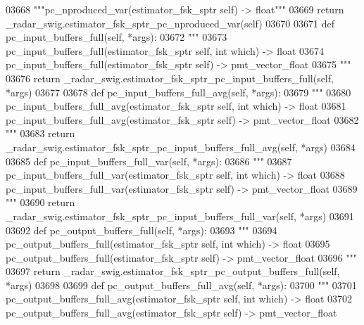 \begin{DoxyCode}
{{{{{{{{{{{{{03668         \textcolor{stringliteral}{"""pc\_nproduced\_var(estimator\_fsk\_sptr self) -> float"""}
03669         \textcolor{keywordflow}{return} \_radar\_swig.estimator\_fsk\_sptr\_pc\_nproduced\_var(self)
03670 
03671     \textcolor{keyword}{def }pc_input_buffers_full(self, *args):
03672         \textcolor{stringliteral}{"""}
03673 \textcolor{stringliteral}{        pc\_input\_buffers\_full(estimator\_fsk\_sptr self, int which) -> float}
03674 \textcolor{stringliteral}{        pc\_input\_buffers\_full(estimator\_fsk\_sptr self) -> pmt\_vector\_float}
03675 \textcolor{stringliteral}{        """}
03676         \textcolor{keywordflow}{return} \_radar\_swig.estimator\_fsk\_sptr\_pc\_input\_buffers\_full(self, *args)
03677 
03678     \textcolor{keyword}{def }pc_input_buffers_full_avg(self, *args):
03679         \textcolor{stringliteral}{"""}
03680 \textcolor{stringliteral}{        pc\_input\_buffers\_full\_avg(estimator\_fsk\_sptr self, int which) -> float}
03681 \textcolor{stringliteral}{        pc\_input\_buffers\_full\_avg(estimator\_fsk\_sptr self) -> pmt\_vector\_float}
03682 \textcolor{stringliteral}{        """}
03683         \textcolor{keywordflow}{return} \_radar\_swig.estimator\_fsk\_sptr\_pc\_input\_buffers\_full\_avg(self, *args)
03684 
03685     \textcolor{keyword}{def }pc_input_buffers_full_var(self, *args):
03686         \textcolor{stringliteral}{"""}
03687 \textcolor{stringliteral}{        pc\_input\_buffers\_full\_var(estimator\_fsk\_sptr self, int which) -> float}
03688 \textcolor{stringliteral}{        pc\_input\_buffers\_full\_var(estimator\_fsk\_sptr self) -> pmt\_vector\_float}
03689 \textcolor{stringliteral}{        """}
03690         \textcolor{keywordflow}{return} \_radar\_swig.estimator\_fsk\_sptr\_pc\_input\_buffers\_full\_var(self, *args)
03691 
03692     \textcolor{keyword}{def }pc_output_buffers_full(self, *args):
03693         \textcolor{stringliteral}{"""}
03694 \textcolor{stringliteral}{        pc\_output\_buffers\_full(estimator\_fsk\_sptr self, int which) -> float}
03695 \textcolor{stringliteral}{        pc\_output\_buffers\_full(estimator\_fsk\_sptr self) -> pmt\_vector\_float}
03696 \textcolor{stringliteral}{        """}
03697         \textcolor{keywordflow}{return} \_radar\_swig.estimator\_fsk\_sptr\_pc\_output\_buffers\_full(self, *args)
03698 
03699     \textcolor{keyword}{def }pc_output_buffers_full_avg(self, *args):
03700         \textcolor{stringliteral}{"""}
03701 \textcolor{stringliteral}{        pc\_output\_buffers\_full\_avg(estimator\_fsk\_sptr self, int which) -> float}
03702 \textcolor{stringliteral}{        pc\_output\_buffers\_full\_avg(estimator\_fsk\_sptr self) -> pmt\_vector\_float}
}}}}}}}}}}}}}
\end{DoxyCode}
